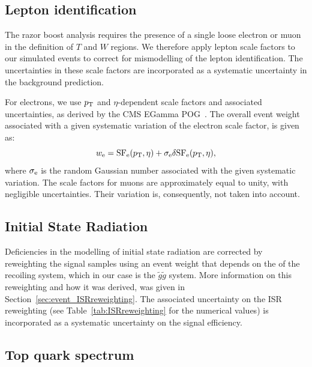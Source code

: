 \subsection{Lepton identification \label{sec:boost_leptonID}} 

The razor boost analysis requires the presence of a single loose electron or muon in the definition
of $T$ and $W$ regions. We therefore apply lepton scale factors to our simulated events to correct
for mismodelling of the lepton identification. The uncertainties in these scale factors are
incorporated as a systematic uncertainty in the background prediction.  

For electrons, we use $p_{\mathrm{T}}$ and $\eta$-dependent scale factors and associated uncertainties, as
derived by the CMS EGamma POG~\cite{ElectronSF}.
The overall event weight associated with a given systematic variation of the electron scale
factor, is given as:
\begin{equation}
w_{\rm e} = {\rm SF_{e}}(p_{\mathrm{T}}, \eta) + \sigma_{\rm e} \delta {\rm SF_{e}}(p_{\mathrm{T}}, \eta), 
\end{equation}
where $\sigma_{\rm e}$ is the random Gaussian number associated with the given systematic variation.
The scale factors for muons are approximately equal to unity, with negligible uncertainties. Their
variation is, consequently, not taken into account.

\subsection{Initial State Radiation} 

Deficiencies in the modelling of initial state radiation are corrected by reweighting the
signal samples using an event weight that depends on the \pt of the recoiling system, which in our
case is the $\tilde{g}\tilde{g}$ system. 
More information on this reweighting and how it was derived, was given in
Section~\ref{sec:event_ISRreweighting}. 
The associated uncertainty on the ISR reweighting (see Table~\ref{tab:ISRreweighting} for the
numerical values) is incorporated as a systematic uncertainty on the signal efficiency. 

\subsection{Top quark \texorpdfstring{\pt}{pT} spectrum} 

